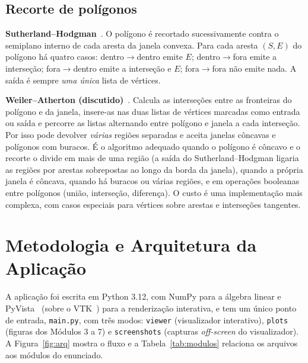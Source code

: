 \documentclass[11pt, a4paper]{article}
\begin{document}
\subsection{Recorte de polígonos}
\textbf{Sutherland--Hodgman}~\cite{sutherland1974}. O polígono é recortado sucessivamente contra o semiplano interno de cada aresta da janela convexa. Para cada aresta $(S,E)$ do polígono há quatro casos: dentro$\to$dentro emite $E$; dentro$\to$fora emite a interseção; fora$\to$dentro emite a interseção e $E$; fora$\to$fora não emite nada. A saída é sempre \emph{uma única} lista de vértices.

\textbf{Weiler--Atherton (discutido)}~\cite{weiler1977}. Calcula as interseções entre as fronteiras do polígono e da janela, insere-as nas duas listas de vértices marcadas como entrada ou saída e percorre as listas alternando entre polígono e janela a cada interseção. Por isso pode devolver \emph{várias} regiões separadas e aceita janelas côncavas e polígonos com buracos. É o algoritmo adequado quando o polígono é côncavo e o recorte o divide em mais de uma região (a saída do Sutherland--Hodgman ligaria as regiões por arestas sobrepostas ao longo da borda da janela), quando a própria janela é côncava, quando há buracos ou várias regiões, e em operações booleanas entre polígonos (união, interseção, diferença). O custo é uma implementação mais complexa, com casos especiais para vértices sobre arestas e interseções tangentes.

\section{Metodologia e Arquitetura da Aplicação}\label{sec:metodo}
A aplicação foi escrita em Python 3.12, com NumPy para a álgebra linear e PyVista~\cite{pyvista} (sobre o VTK~\cite{vtk}) para a renderização interativa, e tem um único ponto de entrada, \texttt{main.py}, com três modos: \texttt{viewer} (visualizador interativo), \texttt{plots} (figuras dos Módulos 3 a 7) e \texttt{screenshots} (capturas \emph{off-screen} do visualizador). A Figura~\ref{fig:arq} mostra o fluxo e a Tabela~\ref{tab:modulos} relaciona os arquivos aos módulos do enunciado.
\end{document}
